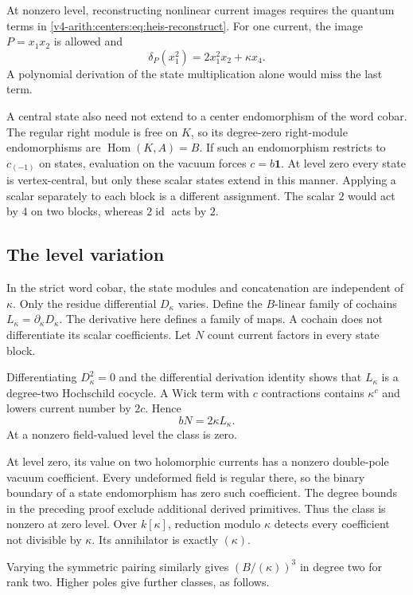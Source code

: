 At nonzero level, reconstructing
nonlinear current images
requires the quantum terms
in \eqref{v4-arith:centers:eq:heis-reconstruct}.
For one current, the image
$P=x_1x_2$ is allowed and
\[
 \delta_P(x_1^2)=2x_1^2x_2+\kappa x_4.
\]
A polynomial derivation of the
state multiplication alone
would miss the last term.

A central state also need
not extend to a center
endomorphism of the word
cobar. The regular right
module is free on $K$, so
its degree-zero right-module
endomorphisms are
$\operatorname{Hom}(K,A)=B$.
If such an endomorphism
restricts to $c_{(-1)}$
on states, evaluation on
the vacuum forces
$c=b\mathbf1$.
At level zero every state
is vertex-central, but only
these scalar states extend
in this manner.
Applying a scalar separately to each block is a different
assignment. The scalar $2$ would act by $4$ on two blocks,
whereas $2\operatorname{id}$ acts by $2$.

\subsection{The level variation}
\label{v4-arith:centers:subsec:level-variation}

In the strict word cobar, the
state modules and concatenation
are independent of $\kappa$.
Only the residue differential
$D_\kappa$ varies. Define the
$B$-linear family of cochains
$L_\kappa=\partial_\kappa D_\kappa$.
The derivative here defines a
family of maps. A cochain does
not differentiate its scalar
coefficients. Let $N$ count
current factors in every
state block.

Differentiating $D_\kappa^2=0$
and the differential derivation
identity shows that $L_\kappa$
is a degree-two Hochschild
cocycle. A Wick term with
$c$ contractions contains
$\kappa^c$ and lowers current
number by $2c$. Hence
\[
 bN=2\kappa L_\kappa.
\]
At a nonzero field-valued
level the class is zero.

At level zero, its value
on two holomorphic currents
has a nonzero double-pole
vacuum coefficient.
Every undeformed field is
regular there, so the binary
boundary of a state
endomorphism has zero such
coefficient. The degree
bounds in the preceding
proof exclude additional
derived primitives.
Thus the class is nonzero
at zero level. Over
$k[\kappa]$, reduction
modulo $\kappa$ detects
every coefficient not
divisible by $\kappa$.
Its annihilator is exactly
$(\kappa)$.

Varying the symmetric pairing
similarly gives
$(B/(\kappa))^3$ in degree
two for rank two.
Higher poles give further
classes, as follows.

